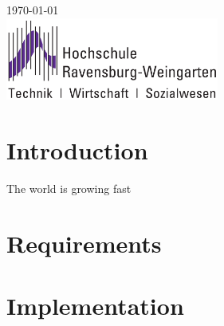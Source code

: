 \documentclass[a4paper,11pt,singlespacing]{article}
\begin{document}
\begin{titlepage}
	
	
	{\large \today}\\[5cm] %
	
	
	
	\includegraphics[width=7cm]{images/logo.png} %
	
	
	\vfill %
	
\end{titlepage}


\tableofcontents
\pagebreak



\section{Introduction}
The world is growing fast

\cite{tello_idea}

\section{Requirements}


\section{Implementation}
\end{document}
